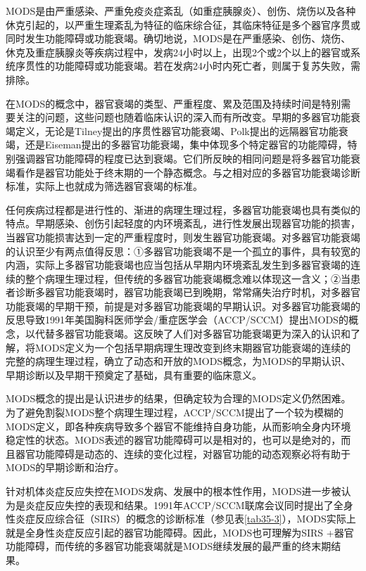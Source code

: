 MODS是由严重感染、严重免疫炎症紊乱（如重症胰腺炎）、创伤、烧伤以及各种休克引起的，以严重生理紊乱为特征的临床综合征，其临床特征是多个器官序贯或同时发生功能障碍或功能衰竭。确切地说，MODS是在严重感染、创伤、烧伤、休克及重症胰腺炎等疾病过程中，发病24小时以上，出现2个或2个以上的器官或系统序贯性的功能障碍或功能衰竭。若在发病24小时内死亡者，则属于复苏失败，需排除。

在MODS的概念中，器官衰竭的类型、严重程度、累及范围及持续时间是特别需要关注的问题，这些问题也随着临床认识的深入而有所改变。早期的多器官功能衰竭定义，无论是Tilney提出的序贯性器官功能衰竭、Polk提出的远隔器官功能衰竭，还是Eiseman提出的多器官功能衰竭，集中体现多个特定器官的功能障碍，特别强调器官功能障碍的程度已达到衰竭。它们所反映的相同问题是将多器官功能衰竭看作是器官功能处于终末期的一个静态概念。与之相对应的多器官功能衰竭诊断标准，实际上也就成为筛选器官衰竭的标准。

任何疾病过程都是进行性的、渐进的病理生理过程，多器官功能衰竭也具有类似的特点。早期感染、创伤引起轻度的内环境紊乱，进行性发展出现器官功能的损害，当器官功能损害达到一定的严重程度时，则发生器官功能衰竭。对多器官功能衰竭的认识至少有两点值得反思：①多器官功能衰竭不是一个孤立的事件，具有较宽的内涵，实际上多器官功能衰竭也应当包括从早期内环境紊乱发生到多器官衰竭的连续的整个病理生理过程，但传统的多器官功能衰竭概念难以体现这一含义；②当患者诊断多器官功能衰竭时，器官功能衰竭已到晚期，常常痛失治疗时机，对多器官功能衰竭的早期干预，前提是对多器官功能衰竭的早期认识。对多器官功能衰竭的反思导致1991年美国胸科医师学会/重症医学会（ACCP/SCCM）提出MODS的概念，以代替多器官功能衰竭。这反映了人们对多器官功能衰竭更为深入的认识和了解，将MODS定义为一个包括早期病理生理改变到终末期器官功能衰竭的连续的完整的病理生理过程，确立了动态和开放的MODS概念，为MODS的早期认识、早期诊断以及早期干预奠定了基础，具有重要的临床意义。

MODS概念的提出是认识进步的结果，但确定较为合理的MODS定义仍然困难。为了避免割裂MODS整个病理生理过程，ACCP/SCCM提出了一个较为模糊的MODS定义，即各种疾病导致多个器官不能维持自身功能，从而影响全身内环境稳定性的状态。MODS表述的器官功能障碍可以是相对的，也可以是绝对的，而且器官功能障碍是动态的、连续的变化过程，对器官功能的动态观察必将有助于MODS的早期诊断和治疗。

针对机体炎症反应失控在MODS发病、发展中的根本性作用，MODS进一步被认为是炎症反应失控的表现和结果。1991年ACCP/SCCM联席会议同时提出了全身性炎症反应综合征（SIRS）的概念的诊断标准（参见表\ref{tab35-3}），MODS实际上就是全身性炎症反应引起的器官功能障碍。因此，MODS也可理解为SIRS
+器官功能障碍，而传统的多器官功能衰竭就是MODS继续发展的最严重的终末期结果。

